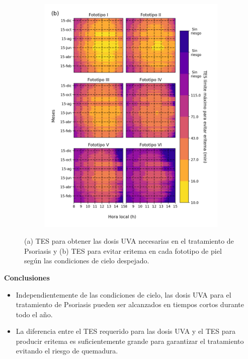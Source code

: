 \documentclass{article}
\begin{document}
\begin{multicols}{2}
\begin{figure}[H]
\begin{subfigure}[H]{0.4\linewidth}
        \includegraphics[scale=0.38]{images/ery.png}
    \end{subfigure}
\caption{(a) TES para obtener las dosis UVA necesarias en el tratamiento de Psoriasis y 
(b) TES para evitar eritema en cada fototipo de piel según las condiciones de cielo despejado.}
\end{figure}
\begin{center}
\begin{shaded}
\textbf{\textcolor{na}{Conclusiones}}
\end{shaded}
\end{center}
\begin{itemize}
    \item Independientemente de las condiciones de cielo, las dosis UVA para el tratamiento de Psoriasis pueden ser alcanzados en tiempos cortos durante todo el año.
    \item La diferencia entre el TES requerido para las dosis UVA y el TES para producir eritema es suficientemente grande para garantizar el tratamiento evitando el riesgo de quemadura.

\end{itemize}
\end{multicols}
\end{document}
